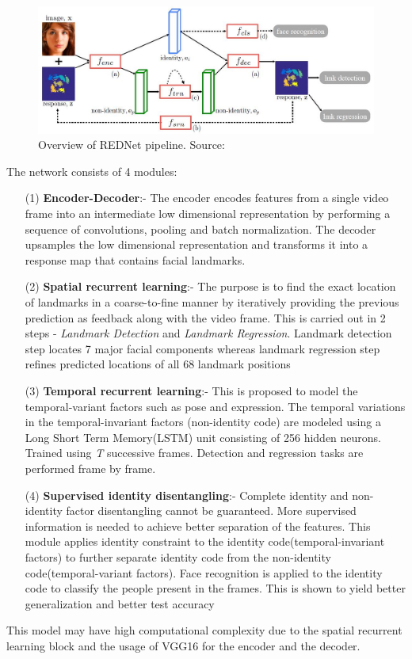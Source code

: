 \documentclass{llncs}
\begin{document}
	\begin{figure}
		\centering
		\includegraphics[scale=0.5]{Media/rednet_architecture}
		\vspace{-3mm}
		\caption{Overview of REDNet pipeline. Source:\cite{rednet}}
		\label{rednet_architecture}
		\vspace{-3mm}
	\end{figure}
	
	The network consists of 4 modules:
	\begin{itemize}
		\item[(1)] \textbf{Encoder-Decoder}:-
		The encoder encodes features from a single video frame into an intermediate low dimensional representation by performing a sequence of convolutions, pooling and batch normalization. The decoder upsamples the low dimensional representation and transforms it into a response map that contains facial landmarks.
		\item[(2)] \textbf{Spatial recurrent learning}:-
		The purpose is to find the exact location of landmarks in a coarse-to-fine manner by iteratively providing the previous prediction as feedback along with the video frame. This is carried out in 2 steps - \textit{Landmark Detection} and \textit{Landmark Regression}. Landmark detection step locates 7 major facial components whereas landmark regression step refines predicted locations of all 68 landmark positions
		\item[(3)] \textbf{Temporal recurrent learning}:-
		This is proposed to model the temporal-variant factors such as pose and expression. The temporal variations in the temporal-invariant factors (non-identity code) are modeled using a Long Short Term Memory(LSTM) unit consisting of 256 hidden neurons.
		Trained using \textit{T} successive frames. Detection and regression tasks are performed frame by frame.
		\item[(4)] \textbf{Supervised identity disentangling}:-
		Complete identity and non-identity factor disentangling cannot be guaranteed. More supervised information is needed to achieve better separation of the features. This module applies identity constraint to the identity code(temporal-invariant factors) to further separate identity code from the non-identity code(temporal-variant factors). Face recognition is applied to the identity code to classify the people present in the frames. This is shown to yield better generalization and better test accuracy
	\end{itemize}
	This model may have high computational complexity due to the spatial recurrent learning block and the usage of VGG16 for the encoder and the decoder.
	
\end{document}
